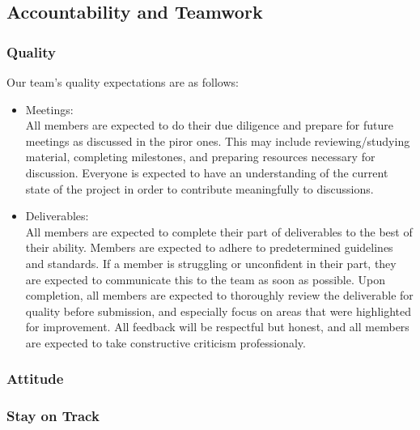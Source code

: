 \documentclass{article}
\begin{document}
\subsection*{Accountability and Teamwork}

\subsubsection*{Quality} 

Our team's quality expectations are as follows:
\begin{itemize}
  \item Meetings: \\All members are expected to do their due diligence and prepare for future meetings as discussed in the piror ones. This may include reviewing/studying material, completing milestones, and preparing resources necessary for discussion. Everyone is expected to have an understanding of the current state of the project in order to contribute meaningfully to discussions.
  \item Deliverables: \\All members are expected to complete their part of deliverables to the best of their ability. Members are expected to adhere to predetermined guidelines and standards. If a member is struggling or unconfident in their part, they are expected to communicate this to the team as soon as possible. Upon completion, all members are expected to thoroughly review the deliverable for quality before submission, and especially focus on areas that were highlighted for improvement. All feedback will be respectful but honest, and all members are expected to take constructive criticism professionaly.
\end{itemize}

\subsubsection*{Attitude}


\subsubsection*{Stay on Track}
\end{document}
